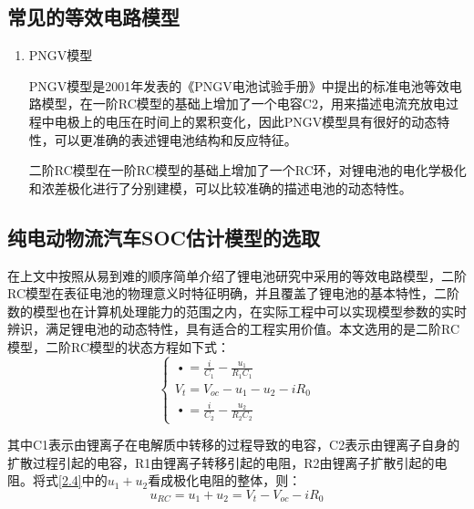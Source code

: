 \subsection{常见的等效电路模型}
\begin{enumerate}

一阶RC模型由一个RC并联电路、一个恒定电阻R2和一个电压源Voc组成。在电路模型中R2代表的是锂电池的欧姆内阻，R1代表电池的极化内阻，电压源Voc代表电池的开路电压。一阶RC模型对锂电池的极化特性进行了描述，可以比较准确的描述锂电池的动态特性，结构也比较简单。
\item PNGV模型

PNGV模型是2001年发表的《PNGV电池试验手册》中提出的标准电池等效电路模型，在一阶RC模型的基础上增加了一个电容C2，用来描述电流充放电过程中电极上的电压在时间上的累积变化，因此PNGV模型具有很好的动态特性，可以更准确的表述锂电池结构和反应特征。

二阶RC模型在一阶RC模型的基础上增加了一个RC环，对锂电池的电化学极化和浓差极化进行了分别建模，可以比较准确的描述电池的动态特性。
\end{enumerate}
\subsection{纯电动物流汽车SOC估计模型的选取}
在上文中按照从易到难的顺序简单介绍了锂电池研究中采用的等效电路模型，二阶RC模型在表征电池的物理意义时特征明确，并且覆盖了锂电池的基本特性，二阶数的模型也在计算机处理能力的范围之内，在实际工程中可以实现模型参数的实时辨识，满足锂电池的动态特性，具有适合的工程实用价值。本文选用的是二阶RC模型，二阶RC模型的状态方程如下式：
\begin{equation}\label{2.4}
\left\{ \begin{array}{l}
\mathop {{u_1}}\limits^ \bullet   = \frac{i}{{{C_1}}} - \frac{{{u_1}}}{{{R_1}{C_1}}}\\
{V_t} = {V_{oc}} - {u_1} - {u_2} - i{R_0}\\
\mathop {{u_2}}\limits^ \bullet   = \frac{i}{{{C_2}}} - \frac{{{u_2}}}{{{R_2}{C_2}}}
\end{array} \right.
\end{equation}

其中C1表示由锂离子在电解质中转移的过程导致的电容，C2表示由锂离子自身的扩散过程引起的电容，R1由锂离子转移引起的电阻，R2由锂离子扩散引起的电阻。将式\ref{2.4}中的${u_1} + {u_2}$看成极化电阻的整体，则：
\begin{equation}\label{2.5}
{u_{RC}} = {u_1} + {u_2} = {V_t} - {V_{oc}} - i{R_0}
\end{equation}

